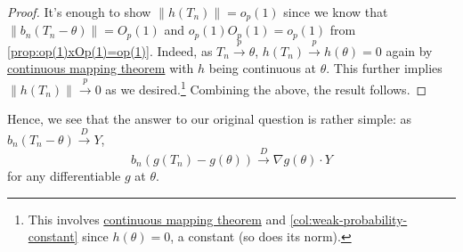 \begin{proof}
	It's enough to show \(\lVert h(T_n) \rVert = o_p(1)\) since we know that \(\lVert b_n (T_n - \theta ) \rVert = O_p(1)\) and \(o_p(1) O_p(1) = o_p(1)\) from \autoref{prop:op(1)xOp(1)=op(1)}. Indeed, as \(T_n \overset{p}{\to } \theta \), \(h(T_n) \overset{p}{\to } h(\theta ) = 0\) again by \hyperref[thm:continuous-mapping]{continuous mapping theorem} with \(h\) being continuous at \(\theta \). This further implies \(\lVert h(T_n) \rVert \overset{p}{\to } 0\) as we desired.\footnote{This involves \hyperref[thm:continuous-mapping]{continuous mapping theorem} and \autoref{col:weak-probability-constant} since \(h(\theta ) = 0\), a constant (so does its norm).} Combining the above, the result follows.
\end{proof}

Hence, we see that the answer to our original question is rather simple: as \(b_n(T_n - \theta ) \overset{D}{\to } Y\),
\[
	b_n(g(T_n) - g(\theta )) \overset{D}{\to } \nabla g(\theta ) \cdot Y
\]
for any differentiable \(g\) at \(\theta \).
